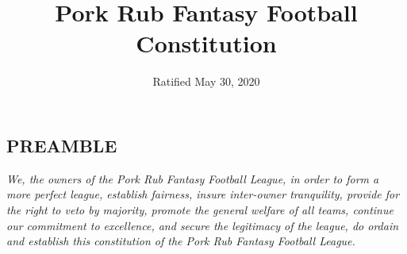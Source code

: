 \documentclass{article}
\title{Pork Rub Fantasy Football Constitution}
\date{Ratified May 30, 2020}
\begin{document}
    \begin{titlepage}
        \maketitle
    \end{titlepage}
    \begin{center}
        \section*{PREAMBLE}
    \end{center}

    \textit{We, the owners of the Pork Rub Fantasy Football League, in order to form a more perfect league, establish fairness, insure inter-owner tranquility, provide for the right to veto by majority, promote the general welfare of all teams, continue our commitment to excellence, and secure the legitimacy of the league, do ordain and establish this constitution of the Pork Rub Fantasy Football League.}
\end{document}
